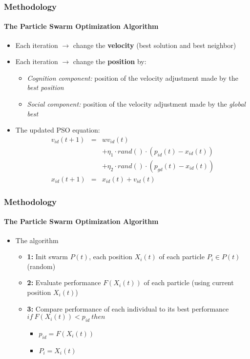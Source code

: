 \frame
{
\frametitle{Methodology}
\framesubtitle{The Particle Swarm Optimization Algorithm}
\begin{itemize}
	\item Each iteration $\rightarrow$ change the \textbf{velocity} (best solution and best neighbor)
	\item Each iteration $\rightarrow$ change the \textbf{position} by:
	\begin{itemize}
		\item \emph{Cognition component:} position of the velocity adjustment made by the \emph{best position}
		\item \emph{Social component:} position of the velocity adjustment made by the \emph{global best}
	\end{itemize}
	\item The updated PSO equation:
	\begin{eqnarray*}
	v_{id}(t+1) &=& wv_{id}(t)\\
			    & & +\eta_{1} \cdot rand() \cdot  (p_{id}(t) - x_{id}(t))\\
				& & +\eta_{2} \cdot rand() \cdot (p_{gd}(t) - x_{id}(t))\\
	x_{id}(t+1) &=& x_{id}(t) + v_{id}(t)
	\end{eqnarray*}
\end{itemize}
}

\frame
{
\frametitle{Methodology}
\framesubtitle{The Particle Swarm Optimization Algorithm}
\begin{itemize}
	\item The algorithm
	\begin{itemize}
		\item \textbf{1:} Init swarm $P(t)$, each position $X_{i}(t)$ of each particle $P_{i} \in P(t)$ (random)
		\item \textbf{2:} Evaluate performance $F(X_{i}(t))$ of each particle (using current position $X_{i}(t)$)
		\item \textbf{3:} Compare performance of each individual to its best performance $if\ F(X_{i}(t)) < p_{id}\ then$
		\begin{itemize}
			\item $p_{id} = F(X_{i}(t))$
			\item $P_{i} = X_{i}(t)$
		\end{itemize}
	\end{itemize}
\end{itemize}
}

